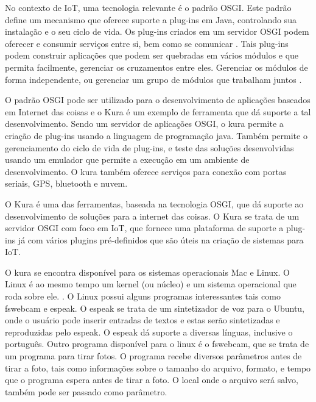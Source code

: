 No contexto de IoT, uma tecnologia relevante é o padrão OSGI. Este padrão define um mecanismo que oferece suporte a plug-ins em Java, controlando sua instalação e o seu ciclo de vida. Os plug-ins criados em um servidor OSGI podem oferecer e consumir serviços entre si, bem como se comunicar \cite{IntroducaoOsgi}. Tais plug-ins podem construir aplicações que podem ser quebradas em vários módulos e que permita facilmente, gerenciar os cruzamentos entre eles. Gerenciar os módulos de forma independente, ou gerenciar um grupo de módulos que trabalham juntos \cite{OsgiVantagens}.

O padrão OSGI pode ser utilizado para o desenvolvimento de aplicações baseados em Internet das coisas e o Kura é um exemplo de ferramenta que dá suporte a tal desenvolvimento. Sendo um servidor de aplicações OSGI, o kura permite a criação de plug-ins usando a linguagem de programação java. Também permite o gerenciamento do ciclo de vida de plug-ins, e teste das soluções desenvolvidas usando um emulador que permite a execução em um ambiente de desenvolvimento. O kura também oferece serviços para conexão com portas seriais, GPS, bluetooth e nuvem.

O Kura é uma das ferramentas, baseada na tecnologia OSGI, que dá suporte ao desenvolvimento de soluções para a internet das coisas. O Kura se trata de um servidor OSGI com foco em IoT, que fornece uma plataforma de suporte a plug-ins já com vários plugins pré-definidos que são úteis na criação de sistemas para IoT.

O kura se encontra disponível para os sistemas operacionais Mac e Linux. O Linux é ao mesmo tempo um kernel (ou núcleo) e um sistema operacional que roda sobre ele. \cite{campos2006linux}. O Linux possui alguns programas interessantes tais como fswebcam e espeak. O espeak se trata de um sintetizador de voz para o Ubuntu, onde o usuário pode inserir entradas de textos e estas serão sintetizadas e reproduzidas pelo espeak. O espeak dá suporte a diversas línguas, inclusive o português. Outro programa disponível para o linux é o fswebcam, que se trata de um programa para tirar fotos. O programa recebe diversos parâmetros antes de tirar a foto, tais como informações sobre o tamanho do arquivo, formato, e tempo que o programa espera antes de tirar a foto. O local onde o arquivo será salvo, também pode ser passado como parâmetro.


